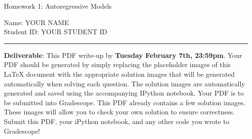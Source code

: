 \documentclass{article}
\newcommand{\ruleskip}{\bigskip\hrule\bigskip}
\begin{document}
\pagestyle{myheadings} 

{\huge
\noindent Homework 1: Autoregressive Models}

\hfill \break
Name: YOUR NAME \\
Student ID: YOUR STUDENT ID
\ruleskip

{\bf Deliverable}: This PDF write-up by {\bf Tuesday February 7th, 23:59pm}.  Your PDF should be generated by simply replacing the placeholder images of this LaTeX document with the appropriate solution images that will be generated automatically when solving each question. The solution images are automatically generated and saved using the accompanying IPython notebook. Your PDF is to be submitted into Gradescope. This PDF already contains a few solution images.  These images will allow you to check your own solution to ensure correctness. Submit this PDF, your iPython notebook, and any other code you wrote to Gradescope!


\vspace{.2in}

\end{document}

